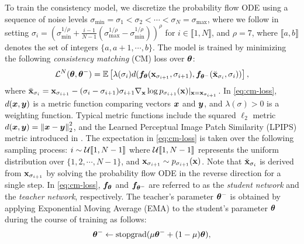 To train the consistency model, we discretize the probability flow ODE using a sequence of noise levels $\sigma_\text{min} = \sigma_1 < \sigma_2 < \cdots < \sigma_N = \sigma_\text{max}$, where we follow \citet{Karras2022edm,song2023consistency} in setting $\sigma_i = (\sigma_\text{min}^{1/\rho} + \frac{i-1}{N - 1}(\sigma_\text{max}^{1/\rho} - \sigma_\text{min}^{1/\rho}))^\rho$ for $i \in \llbracket 1, N \rrbracket$, and $\rho = 7$, where $\llbracket a, b \rrbracket$ denotes the set of integers $\{a, a+1, \cdots, b\}$. The model is trained by minimizing the following \emph{consistency matching} (CM) loss over ${\bm{\theta}}$:
\begin{align}
\mathcal{L}^N({\bm{\theta}}, {\bm{\theta}}^{-}) = \mathbb{E}\left[ \lambda(\sigma_i) d({\bm{f}}_{\bm{\theta}}({\mathbf{x}}_{\sigma_{i+1}}, \sigma_{i+1}), {\bm{f}}_{{\bm{\theta}}^{-}}(\breve{{\mathbf{x}}}_{\sigma_i}, \sigma_i)) \right],\label{eq:cm-loss}
\end{align}
where $\breve{{\mathbf{x}}}_{\sigma_i} = {\mathbf{x}}_{\sigma_{i+1}} - (\sigma_i - \sigma_{i+1})\sigma_{i+1} \nabla_{\mathbf{x}} \log p_{\sigma_{i+1}}({\mathbf{x}})|_{{\mathbf{x}} = {\mathbf{x}}_{\sigma_{i+1}}}$. In \cref{eq:cm-loss}, $d({\bm{x}}, {\bm{y}})$ is a metric function comparing vectors ${\bm{x}}$ and ${\bm{y}}$, and $\lambda(\sigma) > 0$ is a weighting function. Typical metric functions include the squared $\ell_2$ metric $d({\bm{x}}, {\bm{y}}) = \left\lVert{\bm{x}}-{\bm{y}}\right\rVert_2^2$, and the Learned Perceptual Image Patch Similarity (LPIPS) metric introduced in \citet{zhang2018unreasonable}. The expectation in \cref{eq:cm-loss} is taken over the following sampling process: $i \sim \mathcal{U}\llbracket 1, N - 1 \rrbracket$ where $\mathcal{U}\llbracket 1, N-1\rrbracket$ represents the uniform distribution over $\{1,2,\cdots, N-1\}$, and ${\mathbf{x}}_{\sigma_{i+1}} \sim p_{\sigma_{i+1}}({\mathbf{x}})$. Note that $\breve{{\mathbf{x}}}_{\sigma_{i}}$ is derived from ${\mathbf{x}}_{\sigma_{i+1}}$ by solving the probability flow ODE in the reverse direction for a single step. In \cref{eq:cm-loss}, ${\bm{f}}_{{\bm{\theta}}}$ and ${\bm{f}}_{{\bm{\theta}}^{-}}$ are referred to as the \emph{student network} and the \emph{teacher network}, respectively. The teacher's parameter ${\bm{\theta}}^{-}$ is obtained by applying Exponential Moving Average (EMA) to the student's parameter ${\bm{\theta}}$ during the course of training as follows:
\begin{align}
{\bm{\theta}}^{-} \gets \operatorname{stopgrad}(\mu {\bm{\theta}}^{-} + (1 - \mu) {\bm{\theta}}),\label{eq:ema}
\end{align}
